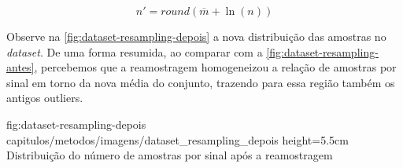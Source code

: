 \begin{equation}
    \label{eqn:resampling-target}
    n' = round( \overline{m} + \ln(n) )
\end{equation}


Observe na \autoref{fig:dataset-resampling-depois} a nova distribuição das amostras no \textit{dataset}. De uma forma resumida, ao comparar com a \autoref{fig:dataset-resampling-antes}, percebemos que a reamostragem homogeneizou a relação de amostras por sinal em torno da nova média do conjunto, trazendo para essa região também os antigos outliers.


\figura
{fig:dataset-resampling-depois} %
{capitulos/metodos/imagens/dataset_resampling_depois} %
{height=5.5cm} %
{Distribuição do número de amostras por sinal após a reamostragem} %
{} %






